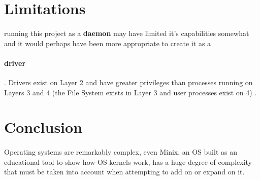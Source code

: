 \documentclass{article}
\begin{document}
\section{Limitations}
    \paragraph{}running this project as a \textbf{daemon} may have limited it's capabilities somewhat and it would perhaps have been more appropriate to create it as a \paragraph{driver}. Drivers exist on Layer 2 and have greater privileges than processes running on Layers 3 and 4 (the File System exists in Layer 3 and user processes exist on 4) \parencite{OS_DESIGN}.

\section{Conclusion}
    \paragraph{}Operating systems are remarkably complex, even Minix, an OS built as an educational tool to show how OS kernels work, has a huge degree of complexity that must be taken into account when attempting to add on or expand on it.

\printbibliography
\end{document}
